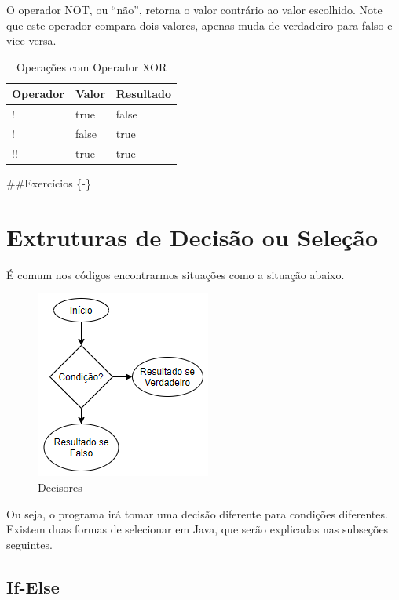 \documentclass[
]{book}
\begin{document}
O operador NOT, ou ``não'', retorna o valor contrário ao valor escolhido. Note que este operador compara dois valores, apenas muda de verdadeiro para falso e vice-versa.

\begin{table}

\caption{\label{tab:unnamed-chunk-12}Operações com Operador XOR}
\centering
\begin{tabular}[t]{l|l|l}
\hline
Operador & Valor & Resultado\\
\hline
! & true & false\\
\hline
! & false & true\\
\hline
!! & true & true\\
\hline
\end{tabular}
\end{table}

\#\#Exercícios \{-\}

\hypertarget{extruturas-de-decisuxe3o-ou-seleuxe7uxe3o}{%
\chapter{Extruturas de Decisão ou Seleção}\label{extruturas-de-decisuxe3o-ou-seleuxe7uxe3o}}

É comum nos códigos encontrarmos situações como a situação abaixo.

\begin{figure}
\centering
\includegraphics{imagens/decisores.png}
\caption{Decisores}
\end{figure}

Ou seja, o programa irá tomar uma decisão diferente para condições diferentes. Existem duas formas de selecionar em Java, que serão explicadas nas subseções seguintes.

\hypertarget{if-else}{%
\section{If-Else}\label{if-else}}
\end{document}
